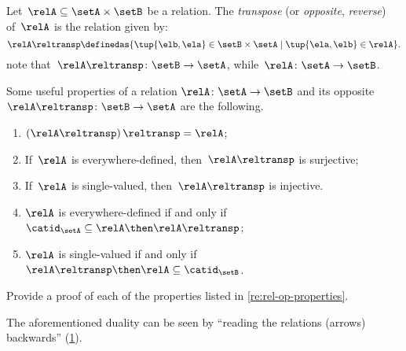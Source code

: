 \begin{definition}
  \label{def:relation-transpose}
  Let~$\relA\subseteq \setA\times \setB$ be a relation. The \emph{transpose} (or \emph{opposite}, \emph{reverse}) of~$\relA$ is the relation given by:
  \begin{equation*}
    \relA\reltransp \definedas \{\tup{\elb,\ela}\in \setB\times \setA \mid \tup{\ela,\elb}\in \relA \}.
  \end{equation*}
  note that~$\relA\reltransp\colon \setB\to \setA$, while~$\relA\colon \setA\to \setB$.
\end{definition}
\begin{remark}\label{re:rel-op-properties}
  Some useful properties of a relation $\relA\colon \setA\to \setB$  and its opposite $\relA\reltransp\colon \setB\to \setA$ are the following.
  \begin{enumerate}
    \item $\left(\relA\reltransp\right)\reltransp = \relA $;
    \item If~$\relA$ is everywhere-defined, then~$\relA\reltransp$ is surjective;
    \item If~$\relA$ is single-valued, then~$\relA\reltransp$ is injective.
    \item $\relA$ is everywhere-defined if and only if~$\catid_\setA\subseteq \relA \then \relA\reltransp$;
    \item $\relA$ is single-valued if and only if~$\relA\reltransp\then \relA\subseteq \catid_\setB$.
  \end{enumerate}
\end{remark}

\begin{gradedexercise}\label{ex:RelProperties}
Provide a proof of each of the properties listed in \cref{re:rel-op-properties}.
\end{gradedexercise}



\begin{remark}
  The aforementioned duality can be seen by ``reading the relations (arrows) backwards'' (\cref{fig:rel_transpose}).
\end{remark}

\begin{figure}[h!]
  \centering
  \caption{}
  \label{fig:rel_transpose}
\end{figure}
